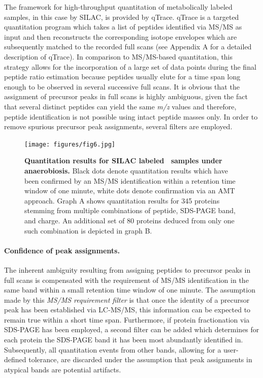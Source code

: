 The framework for high-throughput quantitation of metabolically labeled 
samples, in this case by SILAC, is provided by qTrace.
qTrace is a targeted quantitation program which takes a list of peptides
identified via MS/MS as input and then reconstructs the corresponding isotope 
envelopes which are subsequently matched to the recorded full scans 
(see Appendix A for a detailed description of qTrace).
In comparison to MS/MS-based quantitation, this strategy allows for the
incorporation of a large set of data points during the final peptide ratio
estimation because peptides usually elute for a time span long enough to
be observed in several successive full scans.
It is obvious that the assignment of precursor peaks in full scans is highly
ambiguous, given the fact that several distinct peptides can yield the
same {\em m/z} values and therefore, peptide identification is not possible
using intact peptide masses only.
In order to remove spurious precursor peak assignments, several filters are 
employed.

\begin{figure}
\texttt{[image: figures/fig6.jpg]}
\caption{
{\bf Quantitation results for SILAC labeled \cre~samples under anaerobiosis.} 
Black dots denote quantitation results which have been confirmed by an
MS/MS identification within a retention time window of one minute, white dots
denote confirmation via an AMT approach.
Graph A shows quantitation results for 345 proteins stemming from multiple 
combinations of peptide, SDS-PAGE band, and charge. An additional set of 80 
proteins deduced from only one such combination is depicted in graph B.
}
\label{fig:qtrace-mia}
\end{figure}

\paragraph{Confidence of peak assignments.}

The inherent ambiguity resulting from assigning peptides to precursor peaks in 
full scans is compensated with the requirement of MS/MS identification in the 
same band within a small retention time window of one minute.
The assumption made by this {\em MS/MS requirement filter} is that once the
identity of a precursor peak has been established via LC-MS/MS, this 
information can be expected to remain true within a short time span.
Furthermore, if protein fractionation via SDS-PAGE has been employed, a second 
filter can be added which determines for each protein the SDS-PAGE band it 
has been most abundantly identified in.
Subsequently, all quantitation events from other bands, allowing for a 
user-defined tolerance, are discarded under the assumption that peak 
assignments in atypical bands are potential artifacts.

